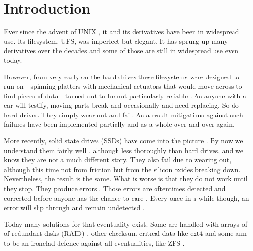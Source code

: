 \chapter*{Introduction}
    \label{ch:intro}

    Ever since the advent of UNIX \cite{UFS}, it and its derivatives have been
    in widespread use. Its filesystem, UFS, was imperfect \cite{FFS} but
    elegant. It has sprung up many derivatives \cite{FFS, LFS, WAFL,
    ext4_origin, ZFS, XFS_scalability} over the decades and some of those are
    still in widespread use even today.

    However, from very early on the hard drives these filesystems were designed
    to run on - spinning platters with mechanical actuators that would move
    across to find pieces of data - turned out to be not particularly reliable
    \cite{Backblaze_stats, hard_drive_failures, RAID,
    data_corruption_storage_stack}. As anyone with a car will testify, moving
    parts break and occasionally and need replacing. So do hard drives. They
    simply wear out and fail. As a result mitigations against such failures
    have been implemented partially \cite{FFS, ext4_docs} and as a whole
    \cite{ZFS} over and over again.


    More recently, solid state drives (SSDs) have come into the picture
    \cite{SSD_sales}. By now we understand them fairly well
    \cite{flash_error_manual}, although less thoroughly than hard drives, and
    we know they are not a much different story. They also fail due to wearing
    out, although this time not from friction but from the silicon oxides
    breaking down. Nevertheless, the result is the same. What is worse is that
    they do not work until they stop. They produce errors \cite{bit_error_mlc,
    bit_error_qlc, flash_large_scale}. Those errors are oftentimes detected and
    corrected before anyone has the chance to care \cite{flash_error_manual}.
    Every once in a while though, an error will slip through and remain
    undetected \cite{flash_reliability}.

    Today many solutions for that eventuality exist. Some are handled with
    arrays of of redundant disks (RAID) \cite{RAID}, other checksum critical
    data like ext4 \cite{ext4_docs} and some aim to be an ironclad defence
    against all eventualities, like ZFS \cite{ZFS}.

